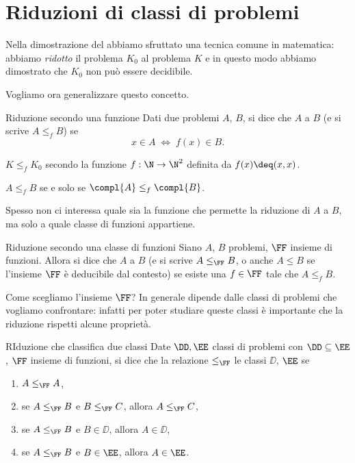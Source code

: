 \section{Riduzioni di classi di problemi}

Nella dimostrazione del  abbiamo sfruttato una tecnica comune in matematica: abbiamo \emph{ridotto} il problema $K_0$ al problema $K$ e in questo modo abbiamo dimostrato che $K_0$ non può essere decidibile.

Vogliamo ora generalizzare questo concetto.

\begin{definition}
    {Riduzione secondo una funzione}{}
    Dati due problemi $A$, $B$, si dice che $A$  a $B$ (e si scrive $A \leq_f B$) se \[
        x \in A \;\iff\; f(x) \in B.
    \] 
\end{definition}

\begin{remark}
    $K \leq_f K_0$ secondo la funzione $f : \N \to \N^2$ definita da $f(x) \deq (x, x)$.   
\end{remark}

\begin{remark}
    $A \leq_f B$ se e solo se $\compl{A} \leq_f \compl{B}$.  
\end{remark}

Spesso non ci interessa quale sia la funzione che permette la riduzione di $A$ a $B$, ma solo a quale classe di funzioni appartiene.

\begin{definition}
    {Riduzione secondo una classe di funzioni}{}
    Siano $A$, $B$ problemi, $\FF$ insieme di funzioni. Allora si dice che $A$  a $B$ (e si scrive $A \leq_{\FF} B$, o anche $A \leq B$ se l'insieme $\FF$ è deducibile dal contesto) se esiste una $f \in \FF$ tale che $A \leq_f B$.   
\end{definition}

Come scegliamo l'insieme $\FF$? In generale dipende dalle classi di problemi che vogliamo confrontare: infatti per poter studiare queste classi è importante che la riduzione rispetti alcune proprietà.

\begin{definition}
    {RIduzione che classifica due classi}{}
    Date $\DD, \EE$ classi di problemi con $\DD \subseteq \EE$, $\FF$ insieme di funzioni, si dice che la relazione $\leq_\FF$  le classi $\DD$, $\EE$ se \begin{enumerate}
        \item $A \leq_\FF A$,
        \item se $A \leq_\FF B$ e $B \leq_\FF C$, allora $A \leq_\FF C$,
        \item se $A \leq_\FF B$ e $B \in \DD$, allora $A \in \DD$,
        \item se $A \leq_\FF B$ e $B \in \EE$, allora $A \in \EE$.       
    \end{enumerate}   
\end{definition}

